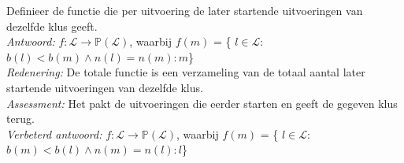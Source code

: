 
\item Definieer de functie die per uitvoering de later startende uitvoeringen van dezelfde klus geeft. \\



\emph{Antwoord:} $f: \mathcal{L}\rightarrow \mathbb{P}(\mathcal{L})$, waarbij $f(m)$ = \{ $l \in \mathcal{L}$: $b(l) < b(m) \wedge n(l)=n(m) : m $\} \\
\emph{Redenering:} De totale functie is een verzameling van de totaal aantal later startende uitvoeringen van dezelfde klus. \\
\emph{Assessment:} Het pakt de uitvoeringen die eerder starten en geeft de gegeven klus terug. \\


\emph{Verbeterd antwoord:} $f: \mathcal{L} \rightarrow \mathbb{P}(\mathcal{L})$, waarbij $f(m)$ = \{ $l \in \mathcal{L}$: $b(m) < b(l) \wedge n(m)=n(l) : l $\} \\
